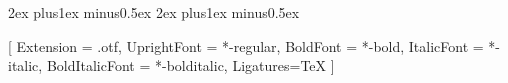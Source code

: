 \usepackage[fixamsmath,disallowspaces]{mathtools}

\usepackage{fixmath}

\usepackage[amsmath,hyperref]{ntheorem}
\theorempreskipamount 2ex plus1ex minus0.5ex
\theorempostskipamount 2ex plus1ex minus0.5ex
\theoremstyle{break}
\newtheorem{definition}{Definition}[chapter]




\ifluatex
  \usepackage[no-math]{fontspec}
  \usepackage{unicode-math}

  \setmainfont{texgyretermes}[
    Extension = .otf,
    UprightFont = *-regular,
    BoldFont = *-bold,
    ItalicFont = *-italic,
    BoldItalicFont = *-bolditalic,
    Ligatures=TeX
  ]
  \setsansfont[Scale=.9]{TeX Gyre Heros}
  \ifwindows
    \setmonofont[StylisticSet={1,3},Scale=.9]{Inconsolata}
  \else
    \setmonofont[StylisticSet={1,3},Scale=.9]{Inconsolatazi4}
  \fi

